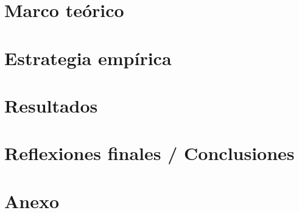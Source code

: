 \documentclass[12pt]{article}
\begin{document}
\section{Marco teórico}


\section{Estrategia empírica}


\section{Resultados}


\section{Reflexiones finales / Conclusiones}



\cleardoublepage
{}
{}






% 

\newpage


\appendix
\section{Anexo}



\end{document}
